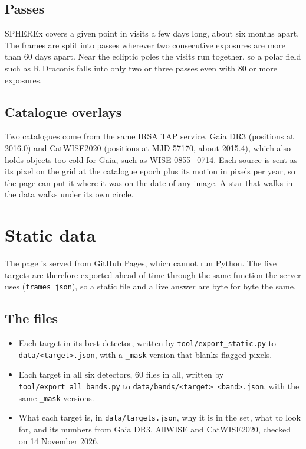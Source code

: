 \documentclass[11pt,a4paper]{article}
\begin{document}
\subsection{Passes}
SPHEREx covers a given point in visits a few days long, about six months apart. The frames are
split into passes wherever two consecutive exposures are more than 60 days apart. Near the
ecliptic poles the visits run together, so a polar field such as R Draconis falls into only two
or three passes even with 80 or more exposures.

\subsection{Catalogue overlays}
Two catalogues come from the same IRSA TAP service, Gaia DR3 (positions at 2016.0) and
CatWISE2020 (positions at MJD 57170, about 2015.4), which also holds objects too cold for Gaia,
such as WISE 0855$-$0714. Each source is sent as its pixel on the grid at the catalogue epoch
plus its motion in pixels per year, so the page can put it where it was on the date of any
image. A star that walks in the data walks under its own circle.

\section{Static data}\label{sec:static}

The page is served from GitHub Pages, which cannot run Python. The five targets are therefore
exported ahead of time through the same function the server uses (\texttt{frames\_json}), so a
static file and a live answer are byte for byte the same.

\subsection{The files}
\sloppy
\begin{itemize}
  \item Each target in its best detector, written by \texttt{tool/export\_static.py} to
        \texttt{data/<target>.json}, with a \texttt{\_mask} version that blanks flagged pixels.
  \item Each target in all six detectors, 60 files in all, written by
        \texttt{tool/export\_all\_bands.py} to \texttt{data/bands/<target>\_<band>.json}, with
        the same \texttt{\_mask} versions.
  \item What each target is, in \texttt{data/targets.json}, why it is in the set, what to look
        for, and its numbers from Gaia DR3, AllWISE and CatWISE2020, checked on 14 November 2026.
\end{itemize}
\fussy
\end{document}
